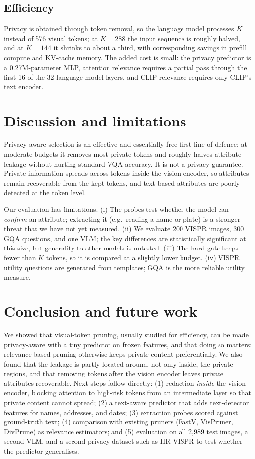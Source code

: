 \documentclass{article}
\begin{document}
\subsection{Efficiency}
Privacy is obtained through token removal, so the language model processes $K$ instead of 576 visual tokens; at $K=288$ the input sequence is roughly halved,
and at $K=144$ it shrinks to about a third, with corresponding savings in prefill compute and KV-cache memory. The added cost is small: the privacy predictor is a
0.27M-parameter MLP, attention relevance requires a partial pass through the first 16 of the 32 language-model layers, and CLIP relevance
requires only CLIP's text encoder.

\section{Discussion and limitations}
Privacy-aware selection is an effective and essentially free first line of defence: at moderate budgets it removes most private tokens and roughly halves
attribute leakage without hurting standard VQA accuracy. It is not a privacy guarantee. Private information spreads across tokens inside the vision encoder,
so attributes remain recoverable from the kept tokens, and text-based attributes are poorly detected at the token level.

Our evaluation has limitations. (i) The probes test whether the model can \emph{confirm} an attribute; extracting it (e.g.\ reading a name or plate) is a stronger
threat that we have not yet measured. (ii) We evaluate 200 VISPR images, 300 GQA questions, and one VLM; the key differences are statistically significant at this
size, but generality to other models is untested. (iii) The hard gate keeps fewer than $K$ tokens, so it is compared at a slightly lower budget.
(iv) VISPR utility questions are generated from templates; GQA is the more reliable utility measure.

\section{Conclusion and future work}
We showed that visual-token pruning, usually studied for efficiency, can be made privacy-aware with a tiny predictor on frozen features, and that doing so
matters: relevance-based pruning otherwise keeps private content preferentially. We also found that the leakage is partly located around, not only inside,
the private regions, and that removing tokens after the vision encoder leaves private attributes recoverable. Next steps follow directly:
(1) redaction \emph{inside} the vision encoder, blocking attention to high-risk tokens from an intermediate layer so that private content cannot spread;
(2) a text-aware predictor that adds text-detector features for names, addresses, and dates; (3) extraction probes scored against ground-truth text;
(4) comparison with existing pruners (FastV, VisPruner, DivPrune) as relevance estimators; and (5) evaluation on all 2,989 test images, a second VLM,
and a second privacy dataset such as HR-VISPR to test whether the predictor generalises.



\end{document}

